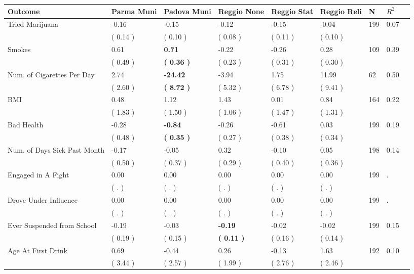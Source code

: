 \begin{tabular}{L{6.2cm} C{1.8cm} C{1.8cm} C{1.8cm} C{1.8cm} C{1.8cm} C{1.8cm} C{0.3cm} C{0.3cm}}
\toprule
 \textbf{Outcome} & \textbf{Parma Muni} & \textbf{Padova Muni} & \textbf{Reggio None} & \textbf{Reggio Stat} & \textbf{Reggio Reli} & \textbf{N} & \textbf{$ R^2$} \\
\midrule
Tried Marijuana &     -0.16 &     -0.15 &     -0.12 &     -0.15 &     -0.04  & 199 &       0.07 \\ 
 & (     0.14 ) & (     0.10 ) & (     0.08 ) & (     0.11 ) & (     0.10 )  & \\
Smokes &      0.61 & \textbf{     0.71} &     -0.22 &     -0.26 &      0.28  & 109 &       0.39 \\ 
 & (     0.49 ) & \textbf{(     0.36 )} & (     0.23 ) & (     0.31 ) & (     0.30 )  & \\
Num. of Cigarettes Per Day &      2.74 & \textbf{   -24.42} &     -3.94 &      1.75 &     11.99  & 62 &       0.50 \\ 
 & (     2.60 ) & \textbf{(     8.72 )} & (     5.32 ) & (     6.78 ) & (     9.41 )  & \\
BMI &      0.48 &      1.12 &      1.43 &      0.01 &      0.84  & 164 &       0.22 \\ 
 & (     1.83 ) & (     1.50 ) & (     1.06 ) & (     1.47 ) & (     1.31 )  & \\
Bad Health &     -0.28 & \textbf{    -0.84} &     -0.26 &     -0.61 &      0.03  & 199 &       0.19 \\ 
 & (     0.48 ) & \textbf{(     0.35 )} & (     0.27 ) & (     0.38 ) & (     0.34 )  & \\
Num. of Days Sick Past Month &     -0.17 &     -0.05 &      0.32 &     -0.10 &      0.05  & 198 &       0.14 \\ 
 & (     0.50 ) & (     0.37 ) & (     0.29 ) & (     0.40 ) & (     0.36 )  & \\
Engaged in A Fight &      0.00 &      0.00 &      0.00 &      0.00 &      0.00  & 199 &          . \\ 
 & (        . ) & (        . ) & (        . ) & (        . ) & (        . )  & \\
Drove Under Influence &      0.00 &      0.00 &      0.00 &      0.00 &      0.00  & 199 &          . \\ 
 & (        . ) & (        . ) & (        . ) & (        . ) & (        . )  & \\
Ever Suspended from School &     -0.19 &     -0.03 & \textbf{    -0.19} &     -0.02 &     -0.02  & 199 &       0.15 \\ 
 & (     0.19 ) & (     0.15 ) & \textbf{(     0.11 )} & (     0.16 ) & (     0.14 )  & \\
Age At First Drink &      0.69 &     -0.44 &      0.26 &     -0.13 &      1.63  & 192 &       0.10 \\ 
 & (     3.44 ) & (     2.57 ) & (     1.99 ) & (     2.76 ) & (     2.46 )  & \\
\bottomrule
\end{tabular}
